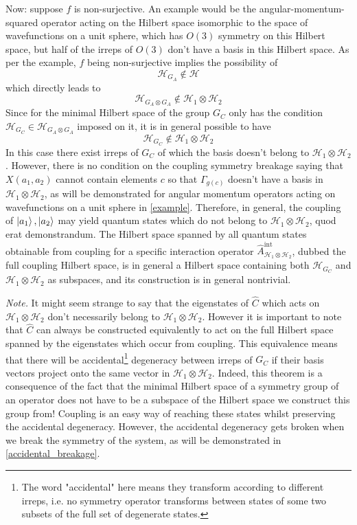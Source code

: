\documentclass[12pt]{article}
\begin{document}
	Now: suppose $f$ is non-surjective. An example would be the angular-momentum-squared operator acting on the Hilbert space isomorphic to the space of wavefunctions on a unit sphere, which has $O(3)$ symmetry on this Hilbert space, but half of the irreps of $O(3)$ don't have a basis in this Hilbert space. As per the example, $f$ being non-surjective implies the possibility of
	$$\mathcal{H}_{G_A}\notin \mathcal{H}$$
	which directly leads to
	$$\mathcal{H}_{G_A\otimes G_A}\notin \mathcal{H}_1\otimes\mathcal{H}_2$$
	Since for the minimal Hilbert space of the group $G_C$ only has the condition $\mathcal{H}_{G_C}\in\mathcal{H}_{G_A\otimes G_A}$ imposed on it, it is in general possible to have
	$$\mathcal{H}_{G_C}\notin \mathcal{H}_1\otimes\mathcal{H}_2$$
	In this case there exist irreps of $G_C$ of which the basis doesn't belong to $\mathcal{H}_1\otimes\mathcal{H}_2$. However, there is no condition on the coupling symmetry breakage saying that $X(a_1,a_2)$ cannot contain elements $c$ so that $\Gamma_{g(c)}$ doesn't have a basis in $\mathcal{H}_1\otimes\mathcal{H}_2$, as will be demonstrated for angular momentum operators acting on wavefunctions on a unit sphere in \ref{example}. Therefore, in general, the coupling of $\ket{a_1},\ket{a_2}$ may yield quantum states which do not belong to $\mathcal{H}_1\otimes\mathcal{H}_2$, quod erat demonstrandum. The Hilbert space spanned by all quantum states obtainable from coupling for a specific interaction operator $\hat{A}^{\text{int}}_{\mathcal{H}_1\otimes\mathcal{H}_2}$, dubbed the full coupling Hilbert space, is in general a Hilbert space containing both $\mathcal{H}_{G_C}$ and $\mathcal{H}_1\otimes\mathcal{H}_2$ as subspaces, and its construction is in general nontrivial.
	
	\textit{Note.} It might seem strange to say that the eigenstates of $\hat{C}$ which acts on $\mathcal{H}_1\otimes\mathcal{H}_2$ don't necessarily belong to $\mathcal{H}_1\otimes\mathcal{H}_2$. However it is important to note that $\hat{C}$ can always be constructed equivalently to act on the full Hilbert space spanned by the eigenstates which occur from coupling. This equivalence means that there will be accidental\footnote{The word "accidental" here means they transform according to different irreps, i.e. no symmetry operator transforms between states of some two subsets of the full set of degenerate states.} degeneracy between irreps of $G_C$ if their basis vectors project onto the same vector in $\mathcal{H}_1\otimes\mathcal{H}_2$. Indeed, this theorem is a consequence of the fact that the minimal Hilbert space of a symmetry group of an operator does not have to be a subspace of the Hilbert space we construct this group from! Coupling is an easy way of reaching these states whilst preserving the accidental degeneracy. However, the accidental degeneracy gets broken when we break the symmetry of the system, as will be demonstrated in \ref{accidental_breakage}.
	
\end{document}
